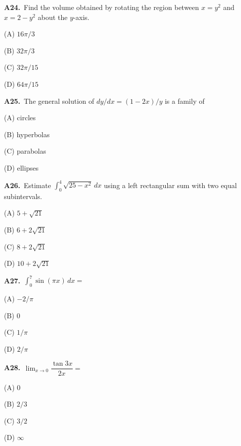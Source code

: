 \documentclass[11pt]{article}
\begin{document}
\bigskip\noindent\textbf{A24.}\ Find the volume obtained by rotating the region between $x=y^2$ and $x=2-y^2$ about the $y$-axis.
\begin{list}{}{\setlength{\leftmargin}{3em}\setlength{\labelwidth}{2.5em}\setlength{\itemsep}{0pt}\setlength{\topsep}{2pt}}
\item[(A)] $16\pi/3$
\item[(B)] $32\pi/3$
\item[(C)] $32\pi/15$
\item[(D)] $64\pi/15$
\end{list}

\bigskip\noindent\textbf{A25.}\ The general solution of $dy/dx=(1-2x)/y$ is a family of
\begin{list}{}{\setlength{\leftmargin}{3em}\setlength{\labelwidth}{2.5em}\setlength{\itemsep}{0pt}\setlength{\topsep}{2pt}}
\item[(A)] circles
\item[(B)] hyperbolas
\item[(C)] parabolas
\item[(D)] ellipses
\end{list}

\bigskip\noindent\textbf{A26.}\ Estimate $\int_0^4\sqrt{25-x^2}\,dx$ using a left rectangular sum with two equal subintervals.
\begin{list}{}{\setlength{\leftmargin}{3em}\setlength{\labelwidth}{2.5em}\setlength{\itemsep}{0pt}\setlength{\topsep}{2pt}}
\item[(A)] $5+\sqrt{21}$
\item[(B)] $6+2\sqrt{21}$
\item[(C)] $8+2\sqrt{21}$
\item[(D)] $10+2\sqrt{21}$
\end{list}

\bigskip\noindent\textbf{A27.}\ $\int_0^7\sin(\pi x)\,dx=$
\begin{list}{}{\setlength{\leftmargin}{3em}\setlength{\labelwidth}{2.5em}\setlength{\itemsep}{0pt}\setlength{\topsep}{2pt}}
\item[(A)] $-2/\pi$
\item[(B)] $0$
\item[(C)] $1/\pi$
\item[(D)] $2/\pi$
\end{list}

\bigskip\noindent\textbf{A28.}\ $\lim_{x\to0}\dfrac{\tan3x}{2x}=$
\begin{list}{}{\setlength{\leftmargin}{3em}\setlength{\labelwidth}{2.5em}\setlength{\itemsep}{0pt}\setlength{\topsep}{2pt}}
\item[(A)] $0$
\item[(B)] $2/3$
\item[(C)] $3/2$
\item[(D)] $\infty$
\end{list}
\end{document}

